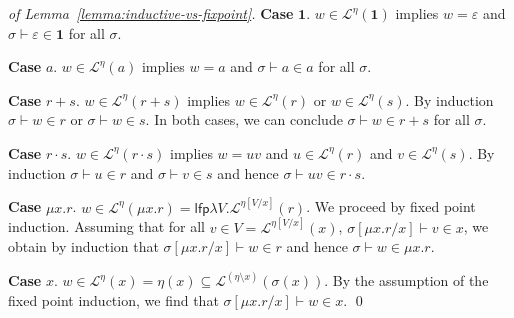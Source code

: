 \documentclass[runningheads, envcountsame, a4paper]{llncs}
\newcommand\LFP{\textsf{lfp}}
\newcommand\Rempty{\mathbf1}
\newcommand\Lang[1][{}]{\mathcal{L}^{#1}}
\renewcommand\L\Lang
\begin{document}
\begin{proof}[of Lemma~\ref{lemma:inductive-vs-fixpoint}]
    \textbf{Case }$\Rempty$. $w\in \L[{\eta}] (\Rempty)$ implies
    $w=\varepsilon$ and $\sigma \vdash \varepsilon \in \Rempty$ for
    all $\sigma$.

    \textbf{Case }$a$. $w \in \L[{\eta}] (a)$ implies $w=a$ and $\sigma
    \vdash a \in a$ for all $\sigma$.

    \textbf{Case }$r+s$. $w \in \L[{\eta}] (r+s) $ implies $w \in \L[{\eta}]
    (r)$ or $w\in\L[{\eta}] (s)$. By induction $\sigma \vdash w \in r$
    or $\sigma \vdash w \in s$. In both cases, we can conclude $\sigma
    \vdash w \in r+s$ for all $\sigma$.

    \textbf{Case }$r \cdot s $. $w\in\L[{\eta}] (r\cdot s)$ implies $w =
    uv$ and $u \in \L[{\eta}] (r)$ and $v \in \L[{\eta}] (s)$. By induction
    $\sigma \vdash u \in r$ and $\sigma \vdash v \in s$ and hence
    $\sigma \vdash uv \in r \cdot s$.

    \textbf{Case }$\mu x.r$. $w \in \L[{ \eta}] (\mu x.r) = \LFP\lambda
    V. \L[{\eta[V/x]}] (r)$. We proceed by fixed point induction. Assuming
    that for all $v \in V = \L[{\eta[V/x]}] (x)$, $\sigma[\mu x.r/x] \vdash v \in x$, we
    obtain by induction that $\sigma[\mu x.r/x] \vdash w \in r$ and
    hence $\sigma \vdash w \in \mu x .r $.

    \textbf{Case }$x$. $w \in \L[{\eta}] (x) = \eta (x) \subseteq \L[{ (\eta \setminus x)}]
    (\sigma (x))$. By the assumption of the
    fixed point induction, we find that $\sigma[\mu x.r/x] \vdash w \in
    x$.
    \qed
\end{proof}
\end{document}
